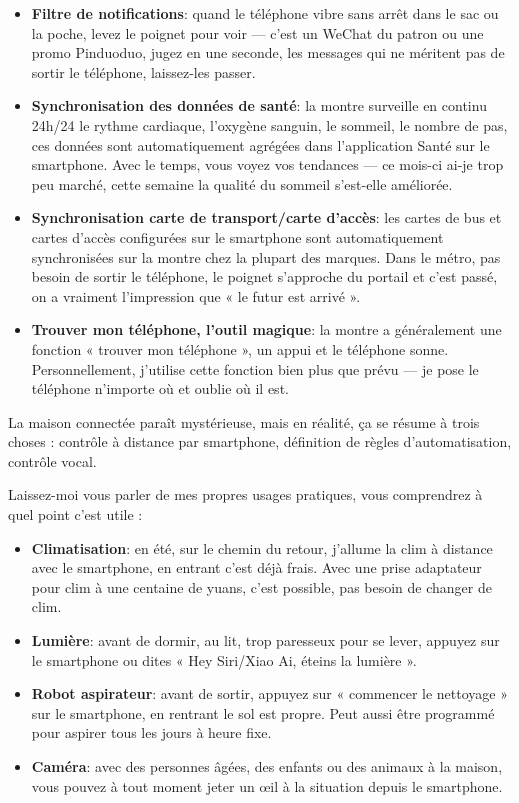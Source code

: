 \begin{itemize}
  \item \textbf{Filtre de notifications}: quand le téléphone vibre sans arrêt dans le sac ou la poche, levez le poignet pour voir — c'est un WeChat du patron ou une promo Pinduoduo, jugez en une seconde, les messages qui ne méritent pas de sortir le téléphone, laissez-les passer.
  \item \textbf{Synchronisation des données de santé}: la montre surveille en continu 24h/24 le rythme cardiaque, l'oxygène sanguin, le sommeil, le nombre de pas, ces données sont automatiquement agrégées dans l'application Santé sur le smartphone. Avec le temps, vous voyez vos tendances — ce mois-ci ai-je trop peu marché, cette semaine la qualité du sommeil s'est-elle améliorée.
  \item \textbf{Synchronisation carte de transport/carte d'accès}: les cartes de bus et cartes d'accès configurées sur le smartphone sont automatiquement synchronisées sur la montre chez la plupart des marques. Dans le métro, pas besoin de sortir le téléphone, le poignet s'approche du portail et c'est passé, on a vraiment l'impression que « le futur est arrivé ».
  \item \textbf{Trouver mon téléphone, l'outil magique}: la montre a généralement une fonction « trouver mon téléphone », un appui et le téléphone sonne. Personnellement, j'utilise cette fonction bien plus que prévu — je pose le téléphone n'importe où et oublie où il est.
\end{itemize}


La maison connectée paraît mystérieuse, mais en réalité, ça se résume à trois choses : contrôle à distance par smartphone, définition de règles d'automatisation, contrôle vocal.

Laissez-moi vous parler de mes propres usages pratiques, vous comprendrez à quel point c'est utile :

\begin{itemize}
  \item \textbf{Climatisation}: en été, sur le chemin du retour, j'allume la clim à distance avec le smartphone, en entrant c'est déjà frais. Avec une prise adaptateur pour clim à une centaine de yuans, c'est possible, pas besoin de changer de clim.
  \item \textbf{Lumière}: avant de dormir, au lit, trop paresseux pour se lever, appuyez sur le smartphone ou dites « Hey Siri/Xiao Ai, éteins la lumière ».
  \item \textbf{Robot aspirateur}: avant de sortir, appuyez sur « commencer le nettoyage » sur le smartphone, en rentrant le sol est propre. Peut aussi être programmé pour aspirer tous les jours à heure fixe.
  \item \textbf{Caméra}: avec des personnes âgées, des enfants ou des animaux à la maison, vous pouvez à tout moment jeter un œil à la situation depuis le smartphone.
\end{itemize}

